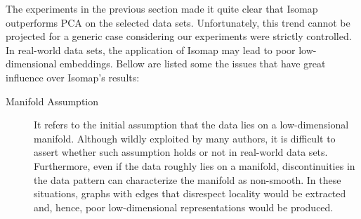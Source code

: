 \documentclass[12pt]{article}
\begin{document}
The experiments in the previous section made it quite clear that Isomap outperforms PCA on the selected data sets. Unfortunately, this trend cannot be projected for a generic case considering our experiments were strictly controlled. In real-world data sets, the application of Isomap may lead to poor low-dimensional embeddings. \cite{herik2009} Bellow are listed some the issues that have great influence over Isomap's results:
\begin{description}
	\item[Manifold Assumption] It refers to the initial assumption that the data lies on a low-dimensional manifold. Although wildly exploited by many authors, it is difficult to assert whether such assumption holds or not in real-world data sets. \cite{lin2008riemannian} Furthermore, even if the data roughly lies on a manifold, discontinuities in the data pattern can characterize the manifold as non-smooth. In these situations, graphs with edges that disrespect locality would be extracted and, hence, poor low-dimensional representations would be produced.


\end{description}
\end{document}
